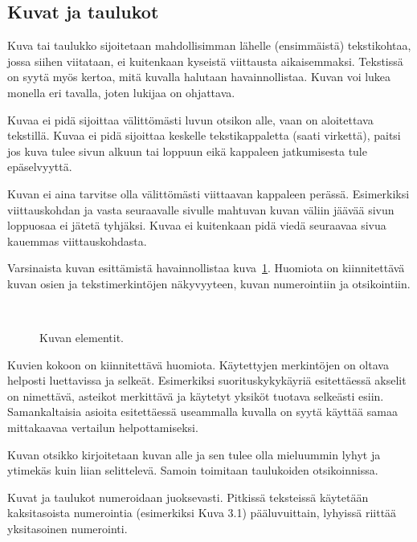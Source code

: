 \documentclass[finnish,gradu]{tktltiki}
\begin{document}
\enlargethispage{5mm}
\subsection{Kuvat ja taulukot}


Kuva tai taulukko sijoitetaan mahdollisimman lähelle
(ensimmäistä) tekstikohtaa, jossa siihen viitataan, ei kuitenkaan
kyseistä viittausta aikaisemmaksi.
Tekstissä on syytä myös kertoa, mitä kuvalla halutaan havainnollistaa.
Kuvan voi lukea monella eri tavalla, joten lukijaa on ohjattava.

Kuvaa ei pidä sijoittaa välittömästi luvun otsikon alle, vaan on
aloitettava tekstillä. Kuvaa ei pidä sijoittaa keskelle tekstikappaletta
(saati virkettä), paitsi jos kuva tulee sivun alkuun tai loppuun eikä
kappaleen jatkumisesta tule epäselvyyttä.

Kuvan ei aina tarvitse olla välittömästi viittaavan kappaleen
perässä. Esimerkiksi viittauskohdan ja
vasta seuraavalle sivulle mahtuvan kuvan väliin jäävää sivun loppuosaa
ei jätetä tyhjäksi. Kuvaa ei kuitenkaan pidä viedä seuraavaa
sivua kauemmas viittauskohdasta.


Varsinaista kuvan esittämistä havainnollistaa kuva~\ref{kuvaesimerkki}.
Huomiota on kiinnitettävä kuvan osien ja tekstimerkintöjen näkyvyyteen,
kuvan numerointiin ja otsikointiin. 

\begin{figure}[h]
\ \newline
\begin{center}
\caption{Kuvan elementit.}
\label{kuvaesimerkki}
\end{center}
\end{figure}


Kuvien kokoon on kiinnitettävä huomiota. Käytettyjen merkintöjen
on oltava helposti luettavissa ja selkeät. Esimerkiksi
suorituskykykäyriä esitettäessä akselit on nimettävä, asteikot
merkittävä ja käytetyt yksiköt tuotava selkeästi esiin.
Samankaltaisia asioita esitettäessä useammalla kuvalla on
syytä käyttää samaa mittakaavaa vertailun helpottamiseksi.

Kuvan otsikko kirjoitetaan kuvan alle ja sen tulee olla mieluummin lyhyt
ja ytimekäs kuin liian selittelevä.
Samoin toimitaan taulukoiden otsikoinnissa.

Kuvat ja taulukot numeroidaan juoksevasti. Pitkissä teksteissä käytetään
kaksitasoista numerointia (esimerkiksi Kuva 3.1) pääluvuittain, lyhyissä
riittää yksitasoinen numerointi.
\end{document}
